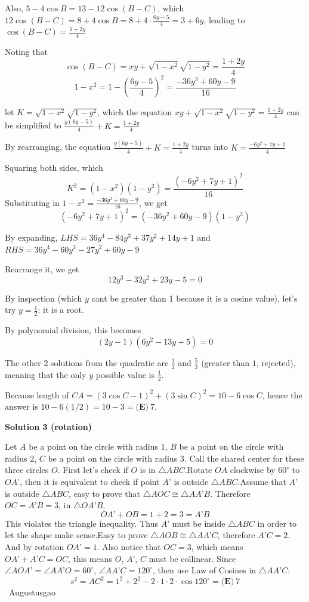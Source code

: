 \begin{enumerate}
 Also, $5 - 4\cos B = 13 - 12\cos(B - C)$, which $12\cos(B - C) = 8 + 4\cos B = 8 + 4\cdot\frac{6y-5}{4} = 3 + 6y$, leading to $\cos(B - C) = \frac{1+2y}{4}$

 Noting that 
 \[\cos(B - C) = xy + \sqrt{1-x^{2}}\sqrt{1-y^{2}} = \frac{1+2y}{4}\]
 \[1 - x^2 = 1 - (\frac{6y-5}{4})^2 = \frac{-36y^2 + 60y - 9}{16}\]

 let $K= \sqrt{1-x^{2}}\sqrt{1-y^{2}}$, which the equation $xy + \sqrt{1-x^{2}}\sqrt{1-y^{2}} = \frac{1+2y}{4}$ can be simplified to $\frac{y(6y-5)}{4} + K = \frac{1+2y}{4}$

 By rearranging, the equation $\frac{y(6y-5)}{4} + K = \frac{1+2y}{4}$ turns into $K = \frac{-6y^2 + 7y + 1}{4}$

 Squaring both sides, which 
 \[K^2 = (1 - x^2)(1 - y^2) = \frac{(-6y^2 + 7y + 1)^2}{16}\]Substituting in $1 - x^2 = \frac{-36y^2 + 60y - 9}{16}$, we get 
 \[(-6y^2 + 7y + 1)^2 = (-36y^2 + 60y - 9)(1 - y^2)\]

 By expanding, $LHS = 36y^4 - 84y^3 + 37y^2 + 14y + 1$ and $RHS = 36y^4 - 60y^3 - 27y^2 + 60y - 9$

 Rearrange it, we get 
 \[12y^3 - 32y^2 + 23y - 5 = 0\]

 By inspection (which $y$ cant be greater than 1 because it is a cosine value), let’s try $y = \frac{1}{2}$: it is a root. 

 By polynomial division, this becomes 
 \[(2y - 1)(6y^2 - 13y + 5) = 0\]

 The other $2$ solutions from the quadratic are $\frac{1}{2}$ and $\frac{5}{3}$ (greater than $1$, rejected), meaning that the only $y$ possible value is $\frac{1}{2}$. 

 Because length of $CA = (3\cos C - 1)^2 + (3\sin C)^2 = 10 - 6\cos C$, hence the answer is $10 - 6(1/2) = 10 - 3 = \boxed{\textbf{(E)} \ 7}.$




\textbf{Solution 3 (rotation)}

Let $A$ be a point on the circle with radius $1$, $B$ be a point on the circle with radius $2$, $C$ be a point on the circle with radius $3$. Call the shared center for these three circles $O$. First let’s check if $O$ is in $\triangle ABC$.Rotate $OA$ clockwise by $60^{\circ}$ to $OA’$, then it is equivalent to check if point $A’$ is outside $\triangle ABC$.Assume that $A’$ is outside $\triangle ABC$, easy to prove that $\triangle AOC\cong \triangle AA’B$. Therefore $OC=A’B=3$, in $\triangle OA’B$,
 \[OA’+OB=1+2=3=A’B\]This violates the triangle inequality. Thus $A’$ must be inside $\triangle ABC$ in order to let the shape make sense.Easy to prove $\triangle AOB\cong \triangle AA’C$, therefore $A’C=2$. And by rotation $OA’=1$. Also notice that $OC=3$, which means $OA’+A’C=OC$, this means $O$, $A’$, $C$ must be collinear. Since $\angle AOA’=\angle AA’O=60^{\circ}$, $\angle AA’C=120^{\circ}$, then use Law of Cosines in $\triangle AA’C$:
 \[s^{2}=AC^{2}=1^{2}+2^{2}-2\cdot 1\cdot{2}\cdot\cos 120^{\circ}=\boxed{\textbf{(E)} \ 7}\]~Augustusgao


\end{enumerate}
